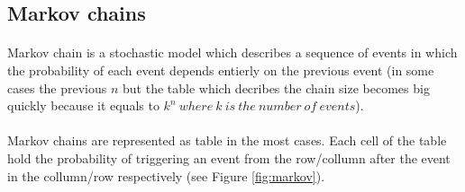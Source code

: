 \documentclass[]{article}
\begin{document}
        \subsection{Markov chains}
        \paragraph{}Markov chain is a stochastic model which describes a sequence of events in which the probability of each event depends entierly on the previous event (in some cases the previous $n$ but the table which decribes the chain size becomes big quickly because it equals to $k^n\ where\ k\ is\ the\ number\ of\ events$).\paragraph{}
                Markov chains are represented as table in the most cases. Each cell of the table hold the probability of triggering an event from the row/collumn after the event in the collumn/row respectively (see Figure \ref{fig:markov}).
\end{document}
